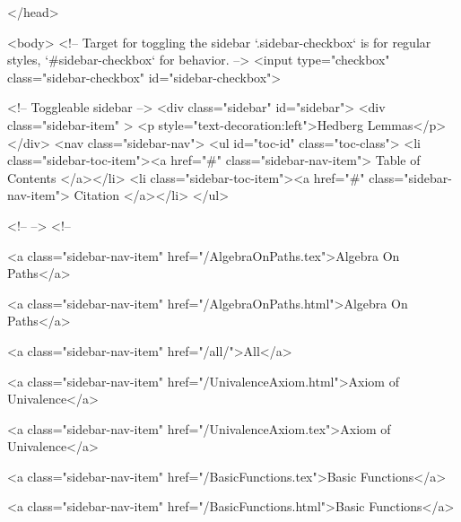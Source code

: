   
</head>




  <body>
    <!-- Target for toggling the sidebar `.sidebar-checkbox` is for regular
     styles, `#sidebar-checkbox` for behavior. -->
<input type="checkbox" class="sidebar-checkbox" id="sidebar-checkbox">

<!-- Toggleable sidebar -->
<div class="sidebar" id="sidebar">
  <div class="sidebar-item" >
    <p style="text-decoration:left">Hedberg Lemmas</p>
  </div>
  <nav class="sidebar-nav">
    <ul id="toc-id" class="toc-class">
  <li class="sidebar-toc-item"><a href="#" class="sidebar-nav-item"> Table of Contents </a></li>
  <li class="sidebar-toc-item"><a href="#" class="sidebar-nav-item"> Citation </a></li>
</ul>


    <!--  -->
    <!-- 
      
    
      
    
      
    
      
        
      
    
      
        
          <a class="sidebar-nav-item" href="/AlgebraOnPaths.tex">Algebra On Paths</a>
        
      
    
      
        
          <a class="sidebar-nav-item" href="/AlgebraOnPaths.html">Algebra On Paths</a>
        
      
    
      
        
          <a class="sidebar-nav-item" href="/all/">All</a>
        
      
    
      
        
          <a class="sidebar-nav-item" href="/UnivalenceAxiom.html">Axiom of Univalence</a>
        
      
    
      
        
          <a class="sidebar-nav-item" href="/UnivalenceAxiom.tex">Axiom of Univalence</a>
        
      
    
      
        
          <a class="sidebar-nav-item" href="/BasicFunctions.tex">Basic Functions</a>
        
      
    
      
        
          <a class="sidebar-nav-item" href="/BasicFunctions.html">Basic Functions</a>
        
